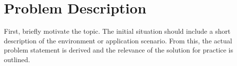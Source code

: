 \section*{Problem Description}
\label{sec:problem}

First, briefly motivate the topic.
The initial situation should include a short description of the environment or application scenario.
From this, the actual problem statement is derived and the relevance of the solution for practice is outlined.

\blindtext
